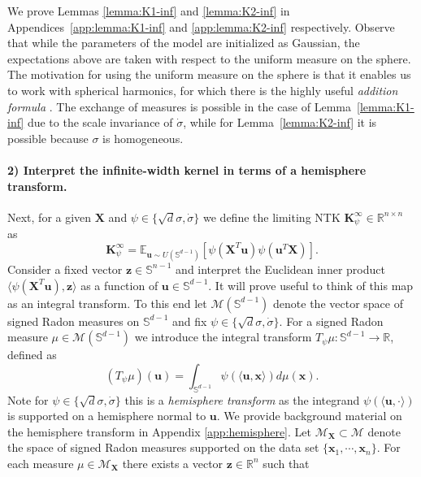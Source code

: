 \documentclass{article}
\theoremstyle{definition}
\newcommand*{\R}{\mathbb{R}}
\newcommand{\E}{\mathbb{E}}
\newcommand{\mc}{\mathcal}
\renewcommand{\S}{\mathbb{S}}
\def\vu{{\bm{u}}}
\def\vx{{\bm{x}}}
\def\vz{{\bm{z}}}
\def\mK{{\bm{K}}}
\def\mX{{\bm{X}}}
\begin{document}
We prove Lemmas \ref{lemma:K1-inf} and \ref{lemma:K2-inf} in Appendices~\ref{app:lemma:K1-inf} and \ref{app:lemma:K2-inf} respectively. Observe that while the parameters of the model are initialized as Gaussian, the expectations above are taken with respect to the uniform measure on the sphere. The motivation for using the uniform measure on the sphere is that it enables us to work with spherical harmonics, for which there is the highly useful \emph{addition formula} \citep[see, e.g.,][Theorem 4.11]{efthimiou2014spherical}. The exchange of measures is possible in the case of Lemma~\ref{lemma:K1-inf} due to the scale invariance of $\dot{\sigma}$, while for Lemma~\ref{lemma:K2-inf} it is possible because $\sigma$ is homogeneous. 

\paragraph{2) Interpret the infinite-width kernel in terms of a hemisphere transform.}
Next, for a given $\mX$ and $\psi \in 
\{\sqrt{d}\sigma, \dot{\sigma}\}$ we define the limiting NTK $\mK^{\infty}_{\psi} \in \R^{n \times n}$ as
\begin{equation} \label{eq:uniform-limiting-NTK}
\mK^{\infty}_{\psi} = \E_{\vu \sim U(\S^{d - 1})}\left[\psi\left( \mX^T\vu\right) \psi\left(\vu^T\mX\right) \right]. 
\end{equation}
Consider a fixed vector $\vz \in \S^{n-1}$ and interpret the Euclidean inner product $\langle \psi(\mX^T \vu), \vz \rangle$ as a function of $\vu \in \S^{d - 1}$. It will prove useful to think of this map as an integral transform. To this end let
$\mathcal{M}(\S^{d - 1})$ denote the vector space of signed Radon measures on $\S^{d - 1}$ and fix $\psi \in \{\sqrt{d}\sigma, \dot{\sigma}\}$. For a signed Radon measure $\mu \in \mc{M}(\S^{d - 1})$ we introduce the integral transform $T_{\psi}\mu: \S^{d - 1} \to \R$, defined as
\begin{equation} \label{eq:hempisphere-transform}
(T_{\psi}\mu)(\vu) = \int_{\S^{d - 1}}\psi(\langle \vu, \vx \rangle) d\mu(\vx).
\end{equation}
Note for $\psi \in \{\sqrt{d}\sigma, \dot{\sigma}\}$ this is a \emph{hemisphere transform} \citep{rubin1999inversion} as the integrand $\psi(\langle \vu, \cdot \rangle)$ is supported on a hemisphere normal to $\vu$. We provide background material on the hemisphere transform in Appendix \ref{app:hemisphere}. Let $\mc{M}_{\mX} \subset \mc{M}$ denote the space of signed Radon measures supported on the data set $\{\vx_1, \cdots, \vx_n\}$. For each measure $\mu \in \mc{M}_{\mX}$ there exists a vector $\vz \in \R^{n}$ such that
\end{document}
